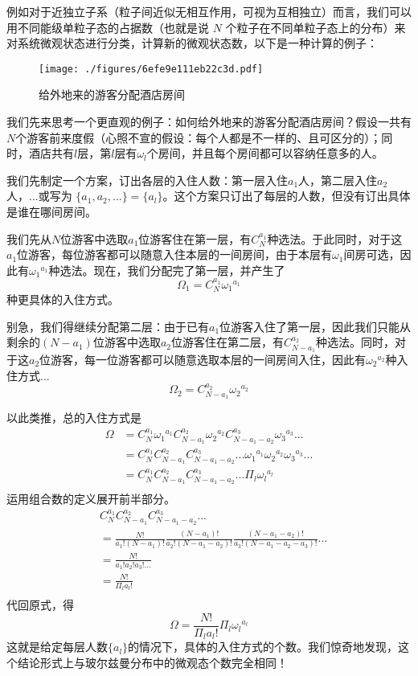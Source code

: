 例如对于近独立子系（粒子间近似无相互作用，可视为互相独立）而言，我们可以用不同能级单粒子态的占据数（也就是说 $N$ 个粒子在不同单粒子态上的分布）来对系统微观状态进行分类，计算新的微观状态数，以下是一种计算的例子：
\begin{example}{}
\begin{figure}[ht]
\centering
\texttt{[image: ./figures/6efe9e111eb22c3d.pdf]}
\caption{给外地来的游客分配酒店房间} \label{fig_entro2_1}
\end{figure}
我们先来思考一个更直观的例子：如何给外地来的游客分配酒店房间？假设一共有$N$个游客前来度假（心照不宣的假设：每个人都是不一样的、且可区分的）；同时，酒店共有$l$层，第$l$层有$\omega_l$个房间，并且每个房间都可以容纳任意多的人。

我们先制定一个方案，订出各层的入住人数：第一层入住$a_1$人，第二层入住$a_2$人，...或写为 $\{a_1,a_2,...\}=\{a_l\}$。这个方案只订出了每层的人数，但没有订出具体是谁在哪间房间。

我们先从$N$位游客中选取$a_1$位游客住在第一层，有$C_N^{a_1}$种选法。于此同时，对于这$a_1$位游客，每位游客都可以随意入住本层的一间房间，由于本层有$\omega_1$间房可选，因此有${\omega_1}^{a_1}$种选法。现在，我们分配完了第一层，并产生了$$\Omega_1 = C_N^{a_1} {\omega_1}^{a_1}$$种更具体的入住方式。

别急，我们得继续分配第二层：由于已有$a_1$位游客入住了第一层，因此我们只能从剩余的$(N-a_1)$位游客中选取$a_2$位游客住在第二层，有$C_{N-a_1}^{a_2}$种选法。同时，对于这$a_2$位游客，每一位游客都可以随意选取本层的一间房间入住，因此有${\omega_2}^{a_2}$种入住方式...
$$\Omega_2 = C_{N-a_1}^{a_2} {\omega_2}^{a_2}$$

以此类推，总的入住方式是
$$
\begin{aligned}
\Omega &= C_N^{a_1} {\omega_1}^{a_1} C_{N-a_1}^{a_2} {\omega_2}^{a_2} C_{N-a_1-a_2}^{a_3} {\omega_3}^{a_3}...\\
&=C_N^{a_1} C_{N-a_1}^{a_2} C_{N-a_1-a_2}^{a_3} ... {\omega_1}^{a_1}{\omega_2}^{a_2}  {\omega_3}^{a_3}...\\
& = C_N^{a_1} C_{N-a_1}^{a_2} C_{N-a_1-a_2}^{a_3} ... \Pi_l{\omega_l}^{a_l}\\
\end{aligned}
$$
运用组合数的定义展开前半部分。
$$
\begin{aligned}
& C_N^{a_1} C_{N-a_1}^{a_2} C_{N-a_1-a_2}^{a_3} ...\\
&= \frac{N!}{a_1!(N-a_1)!} 
\frac{(N-a_1)!}{a_2!(N-a_1-a_2)!}
\frac{(N-a_1-a_2)!}{a_3!(N-a_1-a_2-a_3)!}
...\\
&=\frac{N!}{a_1!a_2!a_3!...} \\
&=\frac{N!}{\Pi_l a_l!} \\
\end{aligned}
$$
代回原式，得
$$
\Omega = \frac{N!}{\Pi_l a_l!}  \Pi_l{\omega_l}^{a_l}
$$
这就是给定每层人数$\{a_l\}$的情况下，具体的入住方式的个数。我们惊奇地发现，这个结论形式上与玻尔兹曼分布中的微观态个数完全相同！


\end{example}

